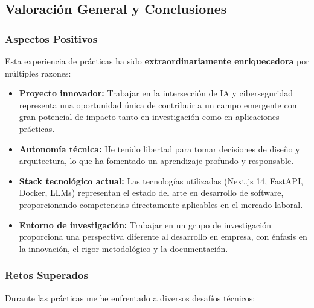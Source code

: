 \documentclass[12pt,a4paper]{article}
\begin{document}
\subsection{Valoración General y Conclusiones}

\subsubsection{Aspectos Positivos}

Esta experiencia de prácticas ha sido \textbf{extraordinariamente enriquecedora} por múltiples razones:

\begin{itemize}
    \item \textbf{Proyecto innovador:} Trabajar en la intersección de IA y ciberseguridad representa una oportunidad única de contribuir a un campo emergente con gran potencial de impacto tanto en investigación como en aplicaciones prácticas.
    
    \item \textbf{Autonomía técnica:} He tenido libertad para tomar decisiones de diseño y arquitectura, lo que ha fomentado un aprendizaje profundo y responsable.
    
    \item \textbf{Stack tecnológico actual:} Las tecnologías utilizadas (Next.js 14, FastAPI, Docker, LLMs) representan el estado del arte en desarrollo de software, proporcionando competencias directamente aplicables en el mercado laboral.
    
    \item \textbf{Entorno de investigación:} Trabajar en un grupo de investigación proporciona una perspectiva diferente al desarrollo en empresa, con énfasis en la innovación, el rigor metodológico y la documentación.
\end{itemize}

\subsubsection{Retos Superados}

Durante las prácticas me he enfrentado a diversos desafíos técnicos:
\end{document}
